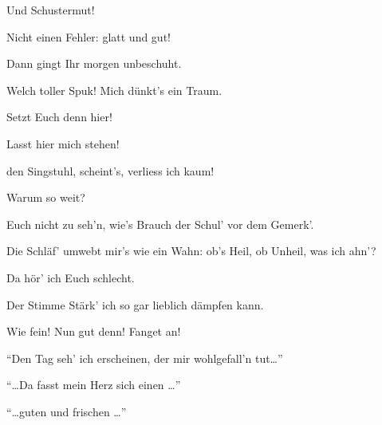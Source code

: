 \begin{drama}
\Sachsspeaks
Und Schustermut!

\Beckmesserspeaks
Nicht einen Fehler:
glatt und gut!



\Sachsspeaks
Dann gingt Ihr morgen unbeschuht.

\Waltherspeaks


Welch toller Spuk!
Mich dünkt's ein Traum.

\Sachsspeaks


Setzt Euch denn hier!

\Beckmesserspeaks


Lasst hier mich stehen!

\Waltherspeaks
den Singstuhl, scheint's, verliess ich kaum!

\Sachsspeaks
Warum so weit?

\Beckmesserspeaks
Euch nicht zu seh'n,
wie's Brauch der Schul' vor dem Gemerk'.

\Evaspeaks


Die Schläf' umwebt mir's wie ein Wahn:
ob's Heil, ob Unheil, was ich ahn'?

\Sachsspeaks
Da hör' ich Euch schlecht.

\Beckmesserspeaks
Der Stimme Stärk'
ich so gar lieblich dämpfen kann.



\Sachsspeaks
Wie fein! Nun gut denn! Fanget an!


\Beckmesserspeaks


``Den Tag seh' ich erscheinen,
der mir wohlgefall'n tut\ldots''


``\ldots Da fasst mein Herz sich einen \ldots''


``\ldots guten und frischen \ldots''


\end{drama}

